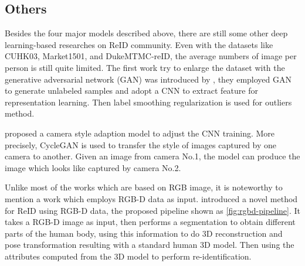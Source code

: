\subsection{Others}
\label{sec:related_work_other}

Besides the four major models described above, there are still some other deep learning-based researches on ReID community.
Even with the datasets like CUHK03, Market1501, and DukeMTMC-reID, the average numbers of image per person is still quite
limited. The first work try to enlarge the dataset with the generative adversarial network (GAN) was introduced by
\cite{first-gan-for-reid}, they employed GAN to generate unlabeled samples and adopt a CNN to extract feature for
representation learning. Then label smoothing regularization is used for outliers method.

\cite{camera-style-adaptation-for-reid} proposed a camera style adaption model to adjust the CNN training. More precisely,
CycleGAN is used to transfer the style of images captured by one camera to another. Given an image from camera No.1, the model
can produce the image which looks like captured by camera No.2.

Unlike most of the works which are based on RGB image, it is noteworthy to mention a work which employs RGB-D data as input.
\cite{rgbd-for-reid} introduced a novel method for ReID using RGB-D data, the proposed pipeline shown as \autoref{fig:rgbd-pipeline}.
It takes a RGB-D image as input, then performs a segmentation to obtain different parts of the human body, using this information
to do 3D reconstruction and pose transformation resulting with a standard human 3D model. Then using the attributes computed from
the 3D model to perform re-identification.

